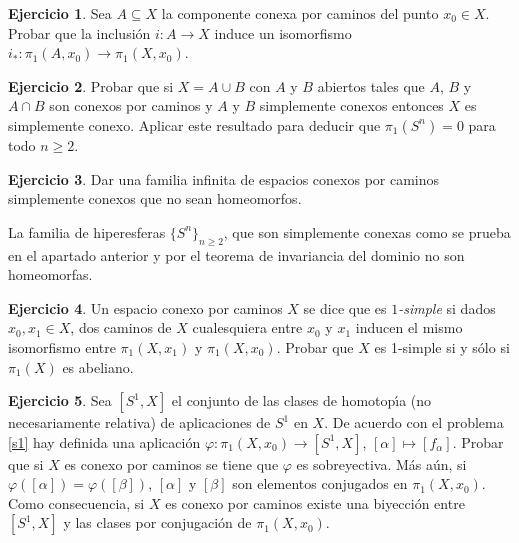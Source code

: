 \documentclass[12pt,a4paper]{amsart}
\theoremstyle{definition}               %
\newtheorem{nothing}{Ejercicio}
\theoremstyle{plain}
\newenvironment{solucion}{\begin{trivlist}
	\item[\hskip \labelsep {\textit{Solución}.}\hskip \labelsep]}{\end{trivlist}}
\begin{document}
\vspace{0.1cm}

\begin{nothing} Sea $A\subseteq X$ la componente conexa por caminos del punto $x_0\in X$. Probar que la inclusi\'on
$i: A\to X$ induce un isomorfismo $i_*: \pi_1(A,x_0) \to \pi_1(X,x_0)$.
\end{nothing}



\begin{nothing}
Probar que si $X = A\cup B$ con $A$ y $B$ abiertos tales que $A$, $B$ y $A\cap B$ son conexos por caminos
 y $A$ y $B$ simplemente conexos entonces  $X$ es simplemente conexo. Aplicar este resultado para deducir
 que $\pi_1(S^n) = 0$ para todo $n \geq 2$.
\end{nothing}

\begin{nothing}
Dar una familia infinita de espacios conexos por caminos simplemente conexos que no sean homeomorfos.
\end{nothing}
\begin{solucion}
La familia de hiperesferas $\{S^n\}_{n\geq 2}$, que son simplemente conexas como se prueba en el apartado anterior y por el teorema de invariancia del dominio no son homeomorfas. 
\end{solucion}

\vspace{0.1cm}

\begin{nothing} Un espacio conexo por caminos $X$ se dice que es {\it $1$-simple} si
dados $x_0, x_1\in X$, dos caminos de $X$ cualesquiera entre $x_0$ y $x_1$ inducen el mismo
isomorfismo entre $\pi_1(X,x_1)$ y $\pi_1(X,x_0)$.
Probar que $X$ es 1-simple si y s\'olo si $\pi_1(X)$ es abeliano.
\end{nothing}


\begin{nothing}
Sea $[S^1,X]$ el conjunto de las clases de homotop\'{\i}a (no necesariamente relativa) de aplicaciones de $S^1$ en $X$. De acuerdo con el problema \ref{s1} hay definida una aplicaci\'on $\varphi: \pi_1(X,x_0) \to [S^1,X]$, $[\alpha] \mapsto [f_{\alpha}]$. Probar que si $X$ es conexo por caminos se tiene que $\varphi$ es sobreyectiva. M\'as a\'un, si $\varphi ([\alpha]) = \varphi([\beta])$, $[\alpha]$ y $[\beta]$ son elementos conjugados en $\pi_1(X,x_0)$.
Como consecuencia, si $X$ es conexo por caminos existe una biyecci\'on entre $[S^1,X]$ y las clases por conjugaci\'on de $\pi_1(X,x_0)$.
\end{nothing}
\end{document}
